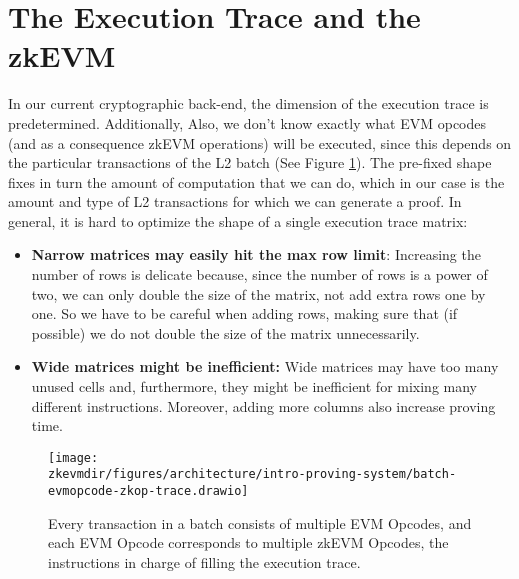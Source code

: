 


\section{The Execution Trace and the zkEVM}

In our current cryptographic back-end, the dimension of the execution trace is predetermined. Additionally, Also, we don’t know exactly what EVM opcodes (and as a consequence zkEVM operations) will be executed, since this depends on the particular transactions of the L2 batch (See Figure \ref{fig:batch-evmopcode-zkop-trace}). The pre-fixed shape fixes in turn the amount of computation that we can do, which in our case is the amount and type of L2 transactions for which we can generate a proof. In general, it is hard to optimize the shape of a single execution trace matrix:

\begin{itemize}
\item \textbf{Narrow matrices may easily hit the max row limit}: Increasing the number of rows is delicate because, since the number of rows is a power of two, we can only double the size of the matrix, not add extra rows one by one. So we have to be careful when adding rows, making sure that (if possible) we do not double the size of the matrix unnecessarily.

\item\textbf{Wide matrices might be inefficient:} Wide matrices may have too many unused cells and, furthermore, they might be inefficient for mixing many different instructions. Moreover, adding more columns also increase proving time.
\end{itemize}


\begin{figure}[h]
\centering
\texttt{[image: \\zkevmdir/figures/architecture/intro-proving-system/batch-evmopcode-zkop-trace.drawio]}
\caption{Every transaction in a batch consists of multiple EVM Opcodes, and each EVM Opcode corresponds to multiple zkEVM Opcodes, the instructions in charge of filling the execution trace.}
\label{fig:batch-evmopcode-zkop-trace}
\end{figure}

